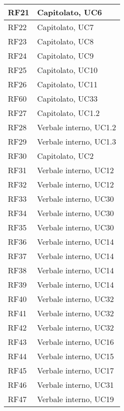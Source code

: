 \begin{center}
\begin{longtable}{|C{5cm}|C{5cm}|}
        \hline
        RF21 & Capitolato, UC6 \\
        \hline
        RF22 & Capitolato, UC7 \\
        \hline
        RF23 & Capitolato, UC8 \\
        \hline
        RF24 & Capitolato, UC9 \\
        \hline
        RF25 & Capitolato, UC10 \\
        \hline
        RF26 & Capitolato, UC11 \\
        \hline
        RF60 & Capitolato, UC33 \\
        \hline
        RF27 & Capitolato, UC1.2 \\
        \hline
        RF28 & Verbale interno, UC1.2 \\
        \hline
        RF29 & Verbale interno, UC1.3 \\
        \hline
        RF30 & Capitolato, UC2 \\
        \hline
        RF31 & Verbale interno, UC12 \\
        \hline
        RF32 & Verbale interno, UC12 \\
        \hline
        RF33 & Verbale interno, UC30 \\
        \hline
        RF34 & Verbale interno, UC30 \\
        \hline
        RF35 & Verbale interno, UC30 \\
        \hline
        RF36 & Verbale interno, UC14 \\
        \hline
        RF37 & Verbale interno, UC14 \\
        \hline
        RF38 & Verbale interno, UC14 \\
        \hline
        RF39 & Verbale interno, UC14 \\
        \hline
        RF40 & Verbale interno, UC32 \\
        \hline
        RF41 & Verbale interno, UC32 \\
        \hline
        RF42 & Verbale interno, UC32 \\
        \hline
        RF43 & Verbale interno, UC16 \\
        \hline
        RF44 & Verbale interno, UC15 \\
        \hline
        RF45 & Verbale interno, UC17 \\
        \hline
        RF46 & Verbale interno, UC31 \\
        \hline
        RF47 & Verbale interno, UC19 \\

\end{longtable}
\end{center}

